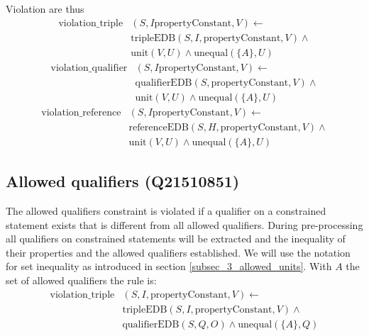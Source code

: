 \documentclass[hyperref,bachelorofscience,fleqn]{cgvpub}
\begin{document}
Violation are thus
\begin{equation*}
\begin{split}
\text{violation\_triple}&(S, I \text{propertyConstant}, V) \leftarrow \\
&\text{tripleEDB}(S, I, \text{propertyConstant}, V) \wedge \\
&\text{unit}(V, U) \wedge \text{unequal}(\{A\}, U)
\end{split}
\end{equation*}
\begin{equation*}
\begin{split}
\text{violation\_qualifier}&(S, I \text{propertyConstant}, V) \leftarrow \\
&\text{qualifierEDB}(S, \text{propertyConstant}, V) \wedge \\
&\text{unit}(V, U) \wedge \text{unequal}(\{A\}, U)
\end{split}
\end{equation*}
\begin{equation*}
\begin{split}
\text{violation\_reference}&(S, I \text{propertyConstant}, V) \leftarrow \\
&\text{referenceEDB}(S, H, \text{propertyConstant}, V) \wedge \\
&\text{unit}(V, U) \wedge \text{unequal}(\{A\}, U)
\end{split}
\end{equation*}

\subsection{Allowed qualifiers (Q21510851)}
The allowed qualifiers constraint is violated if a qualifier on a constrained statement exists that is different from all allowed qualifiers. During pre-processing all qualifiers on constrained statements will be extracted and the inequality of their properties and the allowed qualifiers established. We will use the notation for set inequality as introduced in section \ref{subsec_3_allowed_units}. With \(A\) the set of allowed qualifiers the rule is:
\begin{equation*}
\begin{split}
\text{violation\_triple}&(S, I, \text{propertyConstant}, V) \leftarrow \\
&\text{tripleEDB}(S, I, \text{propertyConstant}, V) \wedge \\
&\text{qualifierEDB}(S, Q, O) \wedge \text{unequal}(\{A\}, Q)
\end{split}
\end{equation*}
\end{document}
